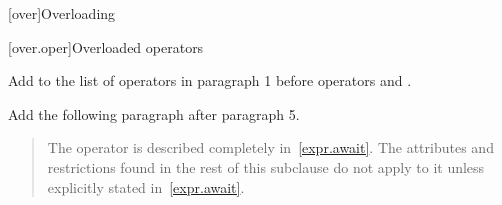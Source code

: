 
\setcounter{chapter}{12}
[over]{Overloading}

\setcounter{section}{4}
[over.oper]{Overloaded operators}

Add  to the list of operators in paragraph 1 before operators \tcode{()} and \tcode{[]}.

Add the following paragraph after paragraph 5.

\begin{quote}
\setcounter{Paras}{5}
\pnum
The 
 operator
is described completely in~\ref{expr.await}.
The attributes and restrictions
found in the rest of this subclause do not apply to it unless explicitly
stated in~\ref{expr.await}.
\end{quote}

%
%
%
%

%

